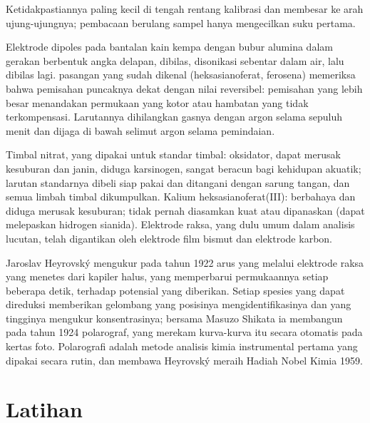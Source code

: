 Ketidakpastiannya paling kecil di tengah rentang kalibrasi dan membesar ke arah
ujung-ujungnya; pembacaan berulang sampel hanya mengecilkan suku pertama.

\begin{inthelab}
Elektrode dipoles pada bantalan kain kempa dengan bubur alumina dalam gerakan
berbentuk angka delapan, dibilas, disonikasi sebentar dalam air, lalu dibilas
lagi.  pasangan yang sudah dikenal (heksasianoferat, ferosena)
memeriksa bahwa pemisahan puncaknya dekat dengan nilai reversibel: pemisahan
yang lebih besar menandakan permukaan yang kotor atau hambatan yang tidak
terkompensasi. Larutannya dihilangkan gasnya dengan argon selama sepuluh
menit dan dijaga di bawah selimut argon selama pemindaian.
\end{inthelab}

\begin{safety}{}
Timbal nitrat, yang dipakai untuk standar timbal: oksidator, dapat merusak
kesuburan dan janin, diduga karsinogen, sangat beracun bagi kehidupan
akuatik; larutan standarnya dibeli siap pakai dan ditangani dengan sarung
tangan, dan semua limbah timbal dikumpulkan. Kalium heksasianoferat(III):
berbahaya dan diduga merusak kesuburan; tidak pernah diasamkan kuat atau
dipanaskan (dapat melepaskan hidrogen sianida). Elektrode raksa, yang dulu
umum dalam analisis lucutan, telah digantikan oleh elektrode film bismut dan
elektrode karbon.
\end{safety}

\begin{history}
Jaroslav Heyrovský mengukur pada tahun 1922 arus yang melalui elektrode raksa
yang menetes dari kapiler halus, yang memperbarui permukaannya setiap beberapa
detik, terhadap potensial yang diberikan. Setiap spesies yang dapat direduksi
memberikan gelombang yang posisinya mengidentifikasinya dan yang tingginya
mengukur konsentrasinya; bersama Masuzo Shikata ia membangun pada tahun 1924
polarograf, yang merekam kurva-kurva itu secara otomatis pada kertas foto.
Polarografi adalah metode analisis kimia instrumental pertama yang dipakai
secara rutin, dan membawa Heyrovský meraih Hadiah Nobel Kimia 1959.
\end{history}

\section{Latihan}

